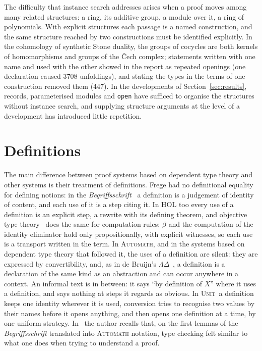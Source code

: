 \documentclass[11pt]{article}
\newcommand{\sys}{\textsc{Unit}}
\newcommand{\kw}[1]{\texttt{#1}}
\begin{document}
The difficulty that instance search addresses arises when a proof moves
among many related structures: a ring, its additive group, a module over
it, a ring of polynomials. With explicit structures each passage is a
named construction, and the same structure reached by two constructions
must be identified explicitly. In the cohomology of synthetic Stone
duality, the groups of cocycles are both kernels of homomorphisms and
groups of the \v{C}ech complex; statements written with one name and
used with the other showed in the report as repeated openings (one
declaration caused 3708 unfoldings), and stating the types in the
terms of one construction removed them (447). In the developments of
Section~\ref{sec:results}, records, parameterised modules and \kw{open}
have sufficed to organise the structures without instance search, and
supplying structure arguments at the level of a development has
introduced little repetition.

\section{Definitions}\label{sec:defs}

The main difference between proof systems based on dependent type theory
and other systems is their treatment of definitions. Frege had no definitional equality for defining notions:
in the \emph{Begriffsschrift}~\cite{Frege} a definition is a judgement
of identity of content, and each use of it is a step citing it. In HOL
too every use of a definition is an explicit step, a rewrite with its
defining theorem, and objective type theory~\cite{OTT} does the same for
computation rules: $\beta$ and the computation of the identity
eliminator hold only propositionally, with explicit witnesses, so each
use is a transport written in the term. In \textsc{Automath}, and in
the systems based on dependent type theory that followed it, the uses
of a definition are silent: they are expressed by
convertibility, and, as in de Bruijn's $\Lambda\Delta$~\cite{LD}, a
definition is a declaration of the same kind as an abstraction and can
occur anywhere in a context. An informal text is in between: it says
``by definition of $X$'' where it uses a definition, and says nothing at
steps it regards as obvious. In \sys\ a definition keeps one identity
wherever it is used, conversion tries to recognise two values by their
names before it opens anything, and then opens one definition at a
time, by one uniform strategy. In~\cite{Rem} the author recalls that, on
the first lemmas of the \emph{Begriffsschrift} translated into
\textsc{Automath} notation, type checking felt similar to what one does
when trying to understand a proof.
\end{document}
